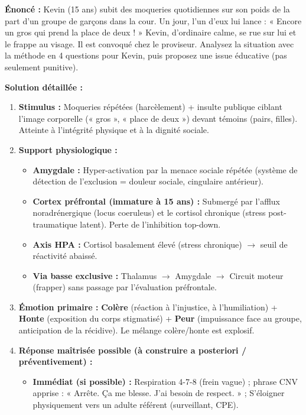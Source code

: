 \documentclass[11pt]{article}
\begin{document}
\begin{exoresolu}
\textbf{Énoncé :} Kevin (15 ans) subit des moqueries quotidiennes sur son poids de la part d'un groupe de garçons dans la cour. Un jour, l'un d'eux lui lance : « Encore un gros qui prend la place de deux ! » Kevin, d'ordinaire calme, se rue sur lui et le frappe au visage. Il est convoqué chez le proviseur. Analysez la situation avec la méthode en 4 questions pour Kevin, puis proposez une issue éducative (pas seulement punitive).

\textbf{Solution détaillée :}
\begin{enumerate}
  \item \textbf{Stimulus :} Moqueries répétées (harcèlement) + insulte publique ciblant l'image corporelle (« gros », « place de deux ») devant témoins (pairs, filles). Atteinte à l'intégrité physique et à la dignité sociale.
  \item \textbf{Support physiologique :}
      \begin{itemize}
        \item \textbf{Amygdale :} Hyper-activation par la menace sociale répétée (système de détection de l'exclusion = douleur sociale, cingulaire antérieur).
        \item \textbf{Cortex préfrontal (immature à 15 ans) :} Submergé par l'afflux noradrénergique (locus coeruleus) et le cortisol chronique (stress post-traumatique latent). Perte de l'inhibition top-down.
        \item \textbf{Axis HPA :} Cortisol basalement élevé (stress chronique) $\rightarrow$ seuil de réactivité abaissé.
        \item \textbf{Via basse exclusive :} Thalamus $\rightarrow$ Amygdale $\rightarrow$ Circuit moteur (frapper) sans passage par l'évaluation préfrontale.
      \end{itemize}
  \item \textbf{Émotion primaire :} \textbf{Colère} (réaction à l'injustice, à l'humiliation) + \textbf{Honte} (exposition du corps stigmatisé) + \textbf{Peur} (impuissance face au groupe, anticipation de la récidive). Le mélange colère/honte est explosif.
  \item \textbf{Réponse maîtrisée possible (à construire a posteriori / préventivement) :}
      \begin{itemize}
        \item \textbf{Immédiat (si possible) :} Respiration 4-7-8 (frein vague) ; phrase CNV apprise : « Arrête. Ça me blesse. J'ai besoin de respect. » ; S'éloigner physiquement vers un adulte référent (surveillant, CPE).

\end{itemize}
\end{enumerate}
\end{exoresolu}
\end{document}
